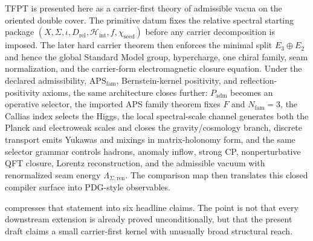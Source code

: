 \documentclass[11pt,a4paper]{article}
\theoremstyle{definition}
\theoremstyle{remark}
\newcommand{\Seam}{\Sigma}
\newcommand{\inv}{\iota}
\newcommand{\Hint}{\mathcal H_{\mathrm{int}}}
\newcommand{\chiseed}{\chi_{\mathrm{seed}}}
\newcommand{\APSfam}{\mathrm{APS}_{\mathrm{fam}}}
\newcommand{\Padm}{P_{\mathrm{adm}}}
\begin{document}
TFPT is presented here as a carrier-first theory of admissible vacua on the oriented double cover. The primitive datum fixes the relative spectral starting package $(X,\Seam,\inv,D_{\mathrm{rel}},\Hint,f,\chiseed)$ before any carrier decomposition is imposed. The later hard carrier theorem then enforces the minimal split $E_3\oplus E_2$ and hence the global Standard Model group, hypercharge, one chiral family, seam normalization, and the carrier-form electromagnetic closure equation. Under the declared admissibility, $\APSfam$, Bernstein-kernel positivity, and reflection-positivity axioms, the same architecture closes further: $\Padm$ becomes an operative selector, the imported APS family theorem fixes $F$ and $N_{\mathrm{fam}}=3$, the Callias index selects the Higgs, the local spectral-scale channel generates both the Planck and electroweak scales and closes the gravity/cosmology branch, discrete transport emits Yukawas and mixings in matrix-holonomy form, and the same selector grammar controls hadrons, anomaly inflow, strong CP, nonperturbative QFT closure, Lorentz reconstruction, and the admissible vacuum with renormalized seam energy $\Lambda_{\Seam,\mathrm{ren}}$. The comparison map then translates this closed compiler surface into PDG-style observables.

 compresses that statement into six headline claims. The point is not that every downstream extension is already proved unconditionally, but that the present draft claims a small carrier-first kernel with unusually broad structural reach.
\end{document}
